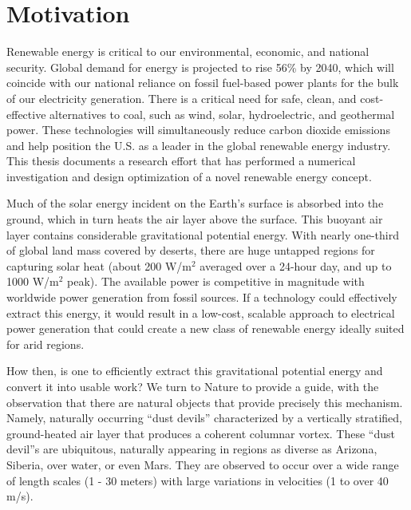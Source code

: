 \label{sec:intro}

%
%


\section{Motivation}

Renewable energy is critical to our environmental, economic, and
national security. Global demand for energy is projected to rise 56\% by
2040\cite{energy-outlook}, which will coincide with our national
reliance on fossil fuel-based power plants for the bulk of our
electricity generation. There is a critical need for safe, clean, and 
cost-effective alternatives to coal, such as wind, solar, hydroelectric,
and geothermal power. These technologies will simultaneously reduce
carbon dioxide emissions and help position the U.S. as a leader in the
global renewable energy industry. 
%
This thesis documents a research effort that has performed a numerical
investigation and design optimization of a novel renewable energy concept. 

Much of the solar energy incident on the Earth's surface is absorbed
into the ground, which in turn heats the air layer above the surface.
This buoyant air layer contains considerable gravitational potential
energy. 
With nearly one-third of global land mass covered by deserts, there are huge
untapped regions for capturing solar heat (about 200 W/$\text{m}^2$
averaged over a 24-hour day, and up to 1000 W/$\text{m}^2$
peak)\cite{Hoyt197827}. The available power is competitive in magnitude
with worldwide power generation from fossil sources. If a technology
could effectively extract this energy, it would result in a low-cost,
scalable approach to electrical power generation that could create a new
class of renewable energy ideally suited for arid regions.  

How then, is one to efficiently extract this gravitational potential
energy and convert it into usable work? We turn to Nature to provide a 
guide, with the observation that there are natural objects that provide
precisely this mechanism. Namely, naturally occurring ``dust devils'' 
characterized by a vertically stratified, ground-heated air layer
that produces a coherent columnar vortex. These ``dust devil''s are
ubiquitous, naturally appearing in regions as diverse as Arizona,
Siberia, over water, or even
Mars\cite{Sinclair1969,ROG:ROG1635,JGRE:JGRE1660}.  
They are observed to occur over a wide range of length scales (1 - 30
meters) with large variations in velocities (1 to over 40
m/s)\cite{Sinclair1969}. 


